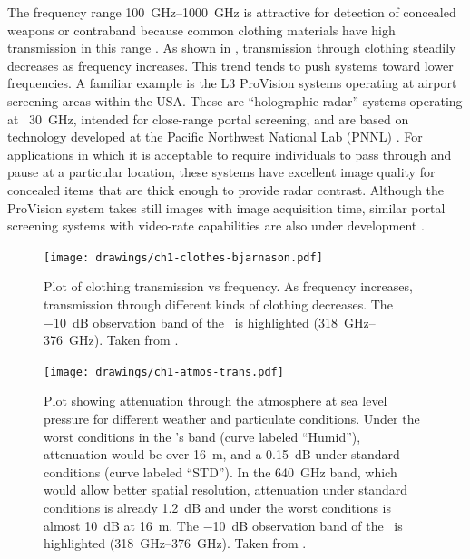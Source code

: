 The frequency range \SIrange{100}{1000}{\GHz} is attractive for detection of concealed weapons or contraband because common clothing materials have high transmission in this range \cite{bjarnason_millimeter-wave_2004}.
As shown in , transmission through clothing steadily decreases as frequency increases.
This trend tends to push systems toward lower frequencies.
A familiar example is the L3 ProVision systems operating at airport screening areas within the USA.
These are ``holographic radar'' systems operating at ~\SI{30}{\GHz}, intended for close-range portal screening, and are based on technology developed at the Pacific Northwest National Lab (PNNL) \cite{sheen_cylindrical_1998,mcmakin_dual-surface_2009}.
For applications in which it is acceptable to require individuals to pass through and pause at a particular location, these systems have excellent image quality for concealed items that are thick enough to provide radar contrast.
Although the ProVision system takes still images with  image acquisition time, similar portal screening systems with video-rate capabilities are also under development \cite{lyons_reflect-array_2013}.

\begin{figure}
\centering
\texttt{[image: drawings/ch1-clothes-bjarnason.pdf]} \\
\caption[Clothing transmission vs frequency]{
  Plot of clothing transmission vs frequency.
  As frequency increases, transmission through different kinds of clothing decreases.
  The \SI{-10}{\dB} observation band of the \Imager\ is highlighted (\SIrange{318}{376}{\GHz}).
  Taken from \cite{bjarnason_millimeter-wave_2004}.
}
\label{fig:ch1-clothes-trans}
\end{figure}

\begin{figure}
\centering
\texttt{[image: drawings/ch1-atmos-trans.pdf]}
\caption[Atmospheric transmission vs frequency]{
  Plot showing attenuation through the atmosphere at sea level pressure for different weather and particulate conditions.
  Under the worst conditions in the \Imager's band (curve labeled ``Humid''), attenuation would be  over \SI{16}{\m}, and a \SI{0.15}{\dB} under standard conditions (curve labeled ``STD'').
  In the \SI{640}{\GHz} band, which would allow better spatial resolution, attenuation under standard conditions is already \SI{1.2}{\dB} and under the worst conditions is almost \SI{10}{\dB} at \SI{16}{\m}.
  The \SI{-10}{\dB} observation band of the \Imager\ is highlighted (\SIrange{318}{376}{\GHz}).
  Taken from \cite{appleby_standoff_2007}.
}
\label{fig:ch1-atmos-trans}
\end{figure}

